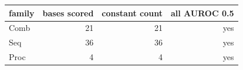 \begin{tabular}{lrrr}
\hline
family & bases scored & constant count & all AUROC 0.5 \\
\hline
Comb & 21 & 21 & yes \\
Seq & 36 & 36 & yes \\
Proc & 4 & 4 & yes \\
\hline
\end{tabular}
